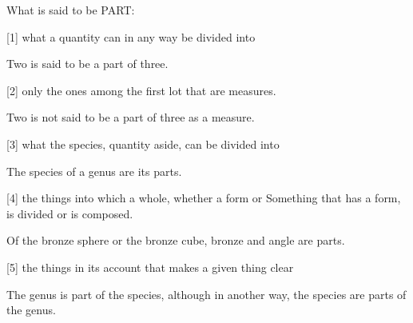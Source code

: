What is said to be PART:

[1]     what a quantity can in any way be divided into

        Two is said to be a part of three.

[2]     only the ones among the first lot that are measures.

        Two is not said to be a part of three as a measure.

[3]     what the species, quantity aside, can be divided into

        The species of a genus are its parts.

[4]     the things into which a whole, whether a form or
        Something that has a form, is divided or is composed.

        Of the bronze sphere or the bronze cube,
        bronze and angle are parts.

[5]     the things in its account that makes a given thing clear

        The genus is part of the species, although in another way,
        the species are parts of the genus.
